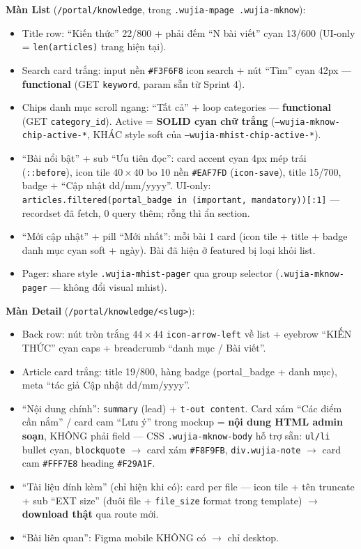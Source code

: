 \textbf{Màn List} (\texttt{/portal/knowledge}, trong \texttt{.wujia-mpage .wujia-mknow}):
\begin{itemize}
  \item Title row: ``Kiến thức'' 22/800 + phải đếm ``N bài viết'' cyan 13/600
        (UI-only = \texttt{len(articles)} trang hiện tại).
  \item Search card trắng: input nền \texttt{\#F3F6F8} icon search + nút ``Tìm'' cyan
        42px --- \textbf{functional} (GET \texttt{keyword}, param sẵn từ Sprint 4).
  \item Chips danh mục scroll ngang: ``Tất cả'' + loop categories --- \textbf{functional}
        (GET \texttt{category\_id}). Active = \textbf{SOLID cyan chữ trắng}
        (\texttt{--wujia-mknow-chip-active-*}, KHÁC style soft của
        \texttt{--wujia-mhist-chip-active-*}).
  \item ``Bài nổi bật'' + sub ``Ưu tiên đọc'': card accent cyan 4px mép trái
        (\texttt{::before}), icon tile \(40\times40\) bo 10 nền \texttt{\#EAF7FD}
        (\texttt{icon-save}), title 15/700, badge + ``Cập nhật dd/mm/yyyy''.
        UI-only: \texttt{articles.filtered(portal\_badge in (important, mandatory))[:1]}
        --- recordset đã fetch, 0 query thêm; rỗng thì ẩn section.
  \item ``Mới cập nhật'' + pill ``Mới nhất'': mỗi bài 1 card (icon tile + title +
        badge danh mục cyan soft + ngày). Bài đã hiện ở featured bị loại khỏi list.
  \item Pager: share style \texttt{.wujia-mhist-pager} qua group selector
        (\texttt{.wujia-mknow-pager} --- không đổi visual mhist).
\end{itemize}

\textbf{Màn Detail} (\texttt{/portal/knowledge/<slug>}):
\begin{itemize}
  \item Back row: nút tròn trắng \(44\times44\) \texttt{icon-arrow-left} về list +
        eyebrow ``KIẾN THỨC'' cyan caps + breadcrumb ``danh mục / Bài viết''.
  \item Article card trắng: title 19/800, hàng badge (portal\_badge + danh mục),
        meta ``tác giả \textbullet{} Cập nhật dd/mm/yyyy''.
  \item ``Nội dung chính'': \texttt{summary} (lead) + \texttt{t-out content}. Card xám
        ``Các điểm cần nắm'' / card cam ``Lưu ý'' trong mockup = \textbf{nội dung HTML
        admin soạn}, KHÔNG phải field --- CSS \texttt{.wujia-mknow-body} hỗ trợ sẵn:
        \texttt{ul/li} bullet cyan, \texttt{blockquote} \(\rightarrow\) card xám
        \texttt{\#F8F9FB}, \texttt{div.wujia-note} \(\rightarrow\) card cam
        \texttt{\#FFF7E8} heading \texttt{\#F29A1F}.
  \item ``Tài liệu đính kèm'' (chỉ hiện khi có): card per file --- icon tile + tên
        truncate + sub ``EXT \textbullet{} size'' (đuôi file + \texttt{file\_size}
        format trong template) \(\rightarrow\) \textbf{download thật} qua route mới.
  \item ``Bài liên quan'': Figma mobile KHÔNG có \(\rightarrow\) chỉ desktop.
\end{itemize}

